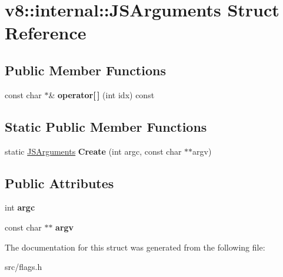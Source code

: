 \hypertarget{structv8_1_1internal_1_1_j_s_arguments}{}\section{v8\+:\+:internal\+:\+:J\+S\+Arguments Struct Reference}
\label{structv8_1_1internal_1_1_j_s_arguments}
\subsection*{Public Member Functions}
\begin{DoxyCompactItemize}
\item 
\hypertarget{structv8_1_1internal_1_1_j_s_arguments_a0d449d2ecce78203c326fc4fc93c0bf5}{}const char $\ast$\& {\bfseries operator\mbox{[}$\,$\mbox{]}} (int idx) const \label{structv8_1_1internal_1_1_j_s_arguments_a0d449d2ecce78203c326fc4fc93c0bf5}

\end{DoxyCompactItemize}
\subsection*{Static Public Member Functions}
\begin{DoxyCompactItemize}
\item 
\hypertarget{structv8_1_1internal_1_1_j_s_arguments_a4087ed780fbba6f32d812cf1218c0715}{}static \hyperlink{structv8_1_1internal_1_1_j_s_arguments}{J\+S\+Arguments} {\bfseries Create} (int argc, const char $\ast$$\ast$argv)\label{structv8_1_1internal_1_1_j_s_arguments_a4087ed780fbba6f32d812cf1218c0715}

\end{DoxyCompactItemize}
\subsection*{Public Attributes}
\begin{DoxyCompactItemize}
\item 
\hypertarget{structv8_1_1internal_1_1_j_s_arguments_a1886b8b020479183b545388d6d0ee808}{}int {\bfseries argc}\label{structv8_1_1internal_1_1_j_s_arguments_a1886b8b020479183b545388d6d0ee808}

\item 
\hypertarget{structv8_1_1internal_1_1_j_s_arguments_a566335f8d558b932afab120b9c99294a}{}const char $\ast$$\ast$ {\bfseries argv}\label{structv8_1_1internal_1_1_j_s_arguments_a566335f8d558b932afab120b9c99294a}

\end{DoxyCompactItemize}


The documentation for this struct was generated from the following file\+:\begin{DoxyCompactItemize}
\item 
src/flags.\+h\end{DoxyCompactItemize}
